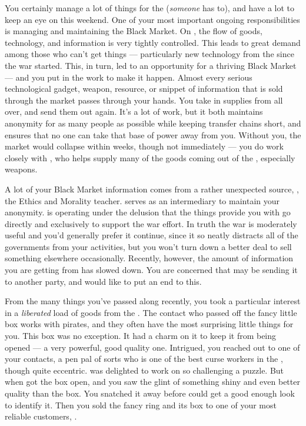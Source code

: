 \documentclass[char]{GL2020}
\begin{document}
You certainly manage a lot of things for the \pGoaties{} (\emph{someone} has to), and have a lot to keep an eye on this weekend. One of your most important ongoing responsibilities is managing and maintaining the Black Market. On \pEarth{}, the flow of goods, technology, and information is very tightly controlled. This leads to great demand among those who can't get things — particularly new technology from the \pTech{} since the war started. This, in turn, led to an opportunity for a thriving Black Market — and you put in the work to make it happen. Almost every serious technological gadget, weapon, resource, or snippet of information that is sold through the market passes through your hands. You take in supplies from all over, and send them out again. It's a lot of work, but it both maintains anonymity for as many people as possible while keeping transfer chains short, and ensures that no one can take that base of power away from you. Without you, the market would collapse within weeks, though not immediately — you do work closely with \cChupInventor{}, who helps supply many of the goods coming out of the \pTech{}, especially weapons. 

A lot of your Black Market information comes from a rather unexpected source, \cEthics{\intro}, the Ethics and Morality teacher. \cLibAssist{\intro} serves as an intermediary to maintain your anonymity. \cEthics{} is operating under the delusion that the things \cEthics{\they} provide\cEthics{\verbs} you with go directly and exclusively to support the \pShip{} war effort. In truth the war is moderately useful and you'd generally prefer it continue, since it so neatly distracts all of the governments from your activities, but you won't turn down a better deal to sell something elsewhere occasionally. Recently, however, the amount of information you are getting from \cEthics{} has slowed down. You are concerned that \cEthics{\they} may be sending it to another party, and would like to put an end to this.

From the many things you've passed along recently, you took a particular interest in a \emph{liberated} load of goods from the \pFarm{}. The contact who passed off the fancy little box works with pirates, and they often have the most surprising little things for you. This box was no exception. It had a charm on it to keep it from being opened — a very powerful, good quality one. Intrigued, you reached out to one of your contacts, a pen pal of sorts who is one of the best curse workers in the \pFarm{}, though quite eccentric. \cCurse{\intro} was delighted to work on so challenging a puzzle. But when \cCurse{\they} got the box open, and you saw the glint of something shiny and even better quality than the box. You snatched it away before \cCurse{} could get a good enough look to identify it. Then you sold the fancy ring and its box to one of your most reliable customers, \cHedonist{\intro}.
\end{document}
